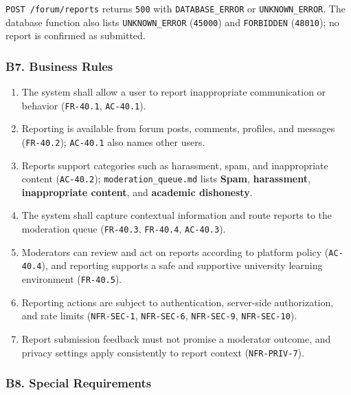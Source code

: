 \documentclass[12pt]{article}
\begin{document}
\texttt{POST /forum/reports} returns \texttt{500} with \texttt{DATABASE\_ERROR} or \texttt{UNKNOWN\_ERROR}. The database function also lists \texttt{UNKNOWN\_ERROR} (\texttt{45000}) and \texttt{FORBIDDEN} (\texttt{48010}); no report is confirmed as submitted.
\par\medskip

\hypertarget{sec:b7-business-rules}{}
\subsubsection*{B7. Business Rules}
\par\medskip

\begin{enumerate}
\item The system shall allow a user to report inappropriate communication or behavior (\texttt{FR-40.1}, \texttt{AC-40.1}).
\item Reporting is available from forum posts, comments, profiles, and messages (\texttt{FR-40.2}); \texttt{AC-40.1} also names other users.
\item Reports support categories such as harassment, spam, and inappropriate content (\texttt{AC-40.2}); \texttt{moderation\_queue.md} lists \textbf{Spam}, \textbf{harassment}, \textbf{inappropriate content}, and \textbf{academic dishonesty}.
\item The system shall capture contextual information and route reports to the moderation queue (\texttt{FR-40.3}, \texttt{FR-40.4}, \texttt{AC-40.3}).
\item Moderators can review and act on reports according to platform policy (\texttt{AC-40.4}), and reporting supports a safe and supportive university learning environment (\texttt{FR-40.5}).
\item Reporting actions are subject to authentication, server-side authorization, and rate limits (\texttt{NFR-SEC-1}, \texttt{NFR-SEC-6}, \texttt{NFR-SEC-9}, \texttt{NFR-SEC-10}).
\item Report submission feedback must not promise a moderator outcome, and privacy settings apply consistently to report context (\texttt{NFR-PRIV-7}).
\end{enumerate}
\par\medskip

\hypertarget{sec:b8-special-requirements}{}
\subsubsection*{B8. Special Requirements}
\par\medskip
\end{document}
